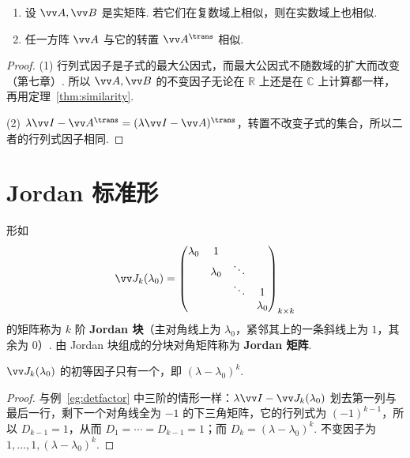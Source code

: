 	\begin{corollary}\label{cor:simfield}
		\begin{enumerate}
			\item 设 $\vv A,\vv B$ 是实矩阵. 若它们在复数域上相似，则在实数域上也相似.
			\item 任一方阵 $\vv A$ 与它的转置 $\vv A^\trans$ 相似.
		\end{enumerate}
	\end{corollary}
	\begin{proof}
		(1) 行列式因子是子式的最大公因式，而最大公因式不随数域的扩大而改变（第七章）. 所以 $\vv A,\vv B$ 的不变因子无论在 $\mathbb{R}$ 上还是在 $\mathbb{C}$ 上计算都一样，再用定理~\ref{thm:similarity}.
		
		(2) $\lambda\vv I-\vv A^\trans=(\lambda\vv I-\vv A)^\trans$，转置不改变子式的集合，所以二者的行列式因子相同.
	\end{proof}
	
	\section{\hB Jordan 标准形}\label{sec:jordan}
	
	\begin{definition}
		形如
		\[\vv J_k(\lambda_0)=\begin{pmatrix}\lambda_0&1&&\\&\lambda_0&\ddots&\\&&\ddots&1\\&&&\lambda_0\end{pmatrix}_{k\times k}\]
		的矩阵称为 $k$ 阶 \textbf{Jordan 块}（主对角线上为 $\lambda_0$，紧邻其上的一条斜线上为 $1$，其余为 $0$）. 由 Jordan 块组成的分块对角矩阵称为 \textbf{Jordan 矩阵}.
	\end{definition}
	
	\begin{lemma}\label{lem:jordanblock}
		$\vv J_k(\lambda_0)$ 的初等因子只有一个，即 $(\lambda-\lambda_0)^k$.
	\end{lemma}
	\begin{proof}
		与例~\ref{eg:detfactor} 中三阶的情形一样：$\lambda\vv I-\vv J_k(\lambda_0)$ 划去第一列与最后一行，剩下一个对角线全为 $-1$ 的下三角矩阵，它的行列式为 $(-1)^{k-1}$，所以 $D_{k-1}=1$，从而 $D_1=\cdots=D_{k-1}=1$；而 $D_k=(\lambda-\lambda_0)^k$. 不变因子为 $1,\ldots,1,(\lambda-\lambda_0)^k$.
	\end{proof}
	
